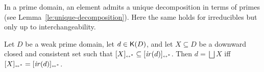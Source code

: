 In a prime domain, an element admits a unique decomposition in
terms of primes (see Lemma~\ref{le:unique-decomposition}). Here the
same holds for irreducibles but only up to interchangeability. 



\begin{proposition}
  \label{pr:unique-dec}
  Let $D$ be a weak prime domain, let $d \in \mathop{\mathsf{K}({D})}$, and let
  $X \subseteq D$ be a downward closed and consistent set such that
  $[{X}]_{\scriptscriptstyle {\leftrightarrow^*}} \subseteq [{\mathop{\mathit{ir}({d})}}]_{\scriptscriptstyle {\leftrightarrow^*}}$. Then $d = \bigsqcup X$
  iff $[{X}]_{\scriptscriptstyle {\leftrightarrow^*}} = [{\mathop{\mathit{ir}({d})}}]_{\scriptscriptstyle {\leftrightarrow^*}}$.
\end{proposition}

